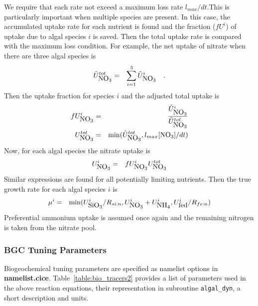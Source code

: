 We require that each rate not exceed a maximum loss rate
$l_{max}/dt$.This is particularly important when multiple species are present.
In this case, the accumulated uptake rate for each nutrient is found and the fraction ($fU^i$) of uptake due to algal species $i$ is
saved. Then the total uptake rate is compared with the maximum loss
condition.  
For example, the net uptake of nitrate when there are three algal species is 
\begin{eqnarray}
\tilde{U}^{tot}_{\mbox{NO$_3$}} & = & \sum^{3}_{i=1}\tilde{U}^i_{\mbox{NO$_3$}}\ \ \ . \nonumber  
\end{eqnarray}
Then the uptake fraction for species $i$ and the adjusted total uptake is 
\begin{eqnarray}
fU^i_{\mbox{NO$_3$}} & = & \frac{\tilde{U}^i_{\mbox{NO$_3$}}}{\tilde{U}^{tot}_{\mbox{NO$_3$}}} \nonumber \\
U^{tot}_{\mbox{NO$_3$}} & = & \min(\tilde{U}^{tot}_{\mbox{NO$_3$}}, l_{max}[\mbox{NO$_3$}]/dt)
\end{eqnarray}
Now, for each algal species the nitrate uptake is
\begin{eqnarray}
U^i_{\mbox{NO$_3$}} & = & fU^i_{\mbox{NO$_3$}} U^{tot}_{\mbox{NO$_3$}}
\end{eqnarray}
Similar expressions are found for all potentially limiting nutrients.
Then the true growth rate for each algal species $i$ is
\begin{eqnarray}
\mu^i & = & \min(U^i_{\mbox{SiO$_3$}}/R_{si:n}, U^i_{\mbox{NO$_3$}} + U^i_{\mbox{NH$_4$}}, U^i_{\mbox{fed}}/R_{fe:n})
\end{eqnarray}
Preferential ammonium uptake is assumed once again and the remaining nitrogen
is taken from the nitrate pool. 

\subsubsection{BGC Tuning Parameters}
Biogeochemical tuning parameters are specified as namelist options in
{\bf namelist.cice}.  Table~\ref{table:bio_tracers2} provides a list of
parameters used in the above reaction equations, their representation in subroutine
{\tt algal\_dyn}, a short description and units.  

